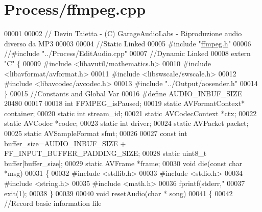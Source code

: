 \hypertarget{ffmpeg_8cpp_source}{\section{\-Process/ffmpeg.cpp}
}

\begin{DoxyCode}
00001 
00002 \textcolor{comment}{// Devin Taietta - (C) GarageAudioLabs - Riproduzione audio diverso da MP3}
00003 
00004 \textcolor{comment}{//Static Linked}
00005 \textcolor{preprocessor}{#include "\hyperlink{ffmpeg_8h}{ffmpeg.h}"}
00006 \textcolor{comment}{//#include "../Process/EditAudio.cpp"}
00007 \textcolor{comment}{//Dynamic Linked}
00008 \textcolor{keyword}{extern} \textcolor{stringliteral}{"C"} \{
00009 \textcolor{preprocessor}{    #include <libavutil/mathematics.h>}
00010 \textcolor{preprocessor}{    #include <libavformat/avformat.h>}
00011 \textcolor{preprocessor}{    #include <libswscale/swscale.h>}
00012 \textcolor{preprocessor}{    #include <libavcodec/avcodec.h>}
00013 \textcolor{preprocessor}{    #include "../Output/aosender.h"}
00014 \}
00015 \textcolor{comment}{//Constants and Global Var}
00016 \textcolor{preprocessor}{#define AUDIO\_INBUF\_SIZE 20480}
00017 \textcolor{preprocessor}{}
00018 \textcolor{keywordtype}{int} FFMPEG\_isPaused;
00019 \textcolor{keyword}{static} AVFormatContext*         container;
00020 \textcolor{keyword}{static} \textcolor{keywordtype}{int}              stream\_id;
00021 \textcolor{keyword}{static} AVCodecContext           *ctx;
00022 \textcolor{keyword}{static} AVCodec              *codec;
00023 \textcolor{keyword}{static} \textcolor{keywordtype}{int}              driver;
00024 \textcolor{keyword}{static} AVPacket             packet;
00025 \textcolor{keyword}{static} AVSampleFormat           sfmt;
00026 
00027 \textcolor{keyword}{const} \textcolor{keywordtype}{int}   buffer\_size=AUDIO\_INBUF\_SIZE + FF\_INPUT\_BUFFER\_PADDING\_SIZE;
00028 \textcolor{keyword}{static} uint8\_t buffer[buffer\_size];
00029 \textcolor{keyword}{static} AVFrame *frame;
00030 \textcolor{keywordtype}{void} die(\textcolor{keyword}{const} \textcolor{keywordtype}{char} *msg)
00031 \{
00032 \textcolor{preprocessor}{    #include <stdlib.h>}
00033 \textcolor{preprocessor}{    #include <stdio.h>}
00034 \textcolor{preprocessor}{    #include <string.h>}
00035 \textcolor{preprocessor}{    #include <math.h>}
00036     fprintf(stderr,\textcolor{stringliteral}{"%
00037     exit(1);
00038 \}
00039 
00040 \textcolor{keywordtype}{void} resetAudio(\textcolor{keywordtype}{char} * song)
00041 \{
00042     \textcolor{comment}{//Record basic information file}
}
\end{DoxyCode}

